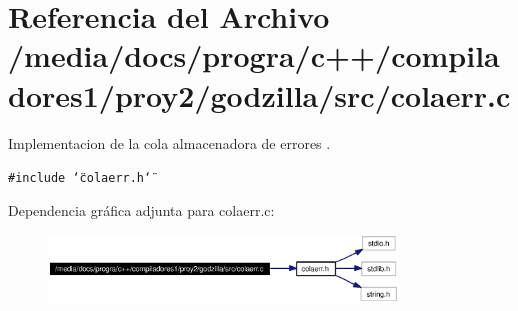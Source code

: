 \section{Referencia del Archivo /media/docs/progra/c++/compiladores1/proy2/godzilla/src/colaerr.c}
\label{colaerr_8c}
Implementacion de la cola almacenadora de errores . 

{\tt \#include \char`\"{}colaerr.h\char`\"{}}\par


Dependencia gr\'{a}fica adjunta para colaerr.c:\begin{figure}[H]
\begin{center}
\leavevmode
\includegraphics[width=263pt]{colaerr_8c__incl}
\end{center}
\end{figure}
